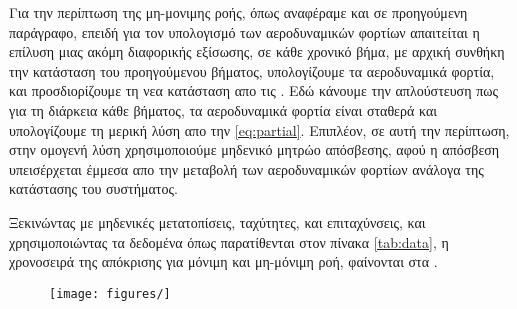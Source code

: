 Για την περίπτωση της μη-μονιμης ροής, όπως αναφέραμε και σε προηγούμενη παράγραφο, επειδή για τον υπολογισμό των αεροδυναμικών φορτίων απαιτείται η επίλυση μιας ακόμη διαφορικής εξίσωσης, σε κάθε χρονικό βήμα, με αρχική συνθήκη την κατάσταση του προηγούμενου βήματος, υπολογίζουμε τα αεροδυναμικά φορτία, και προσδιορίζουμε τη νεα κατάσταση απο τις . Εδώ κάνουμε την απλούστευση πως για τη διάρκεια κάθε βήματος, τα αεροδυναμικά φορτία είναι σταθερά και υπολογίζουμε τη μερική λύση απο την \cref{eq:partial}. Επιπλέον, σε αυτή την περίπτωση, στην ομογενή λύση χρησιμοποιούμε μηδενικό μητρώο απόσβεσης, αφού η απόσβεση υπεισέρχεται έμμεσα απο την μεταβολή των αεροδυναμικών φορτίων ανάλογα της κατάστασης του συστήματος. 

Ξεκινώντας με μηδενικές μετατοπίσεις, ταχύτητες, και επιταχύνσεις, και χρησιμοποιώντας τα δεδομένα όπως παρατίθενται στον πίνακα \ref{tab:data}, η χρονοσειρά της απόκρισης για μόνιμη και μη-μόνιμη ροή, φαίνονται στα .

\begin{figure}
    \begin{center}
        \texttt{[image: figures/]}
    \end{center}
    \caption{}\label{fig:}
\end{figure}



